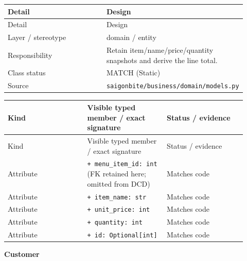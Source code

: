 \begin{longtable}{>{\raggedright\arraybackslash}p{0.4600\linewidth}>{\raggedright\arraybackslash}p{0.4600\linewidth}}
Detail & Design \\
\hline\endfirsthead
Detail & Design \\
\hline\endhead
Layer / stereotype & domain / \guillemotleft{}entity\guillemotright{} \\
Responsibility & Retain item/name/price/quantity snapshots and derive the line total. \\
Class status & MATCH (Static) \\
Source & \texttt{saigonbite/\allowbreak{}business/\allowbreak{}domain/\allowbreak{}models.\allowbreak{}py} \\
\end{longtable}
\begin{longtable}{>{\raggedright\arraybackslash}p{0.3067\linewidth}>{\raggedright\arraybackslash}p{0.3067\linewidth}>{\raggedright\arraybackslash}p{0.3067\linewidth}}
Kind & Visible typed member / exact signature & Status / evidence \\
\hline\endfirsthead
Kind & Visible typed member / exact signature & Status / evidence \\
\hline\endhead
Attribute & \texttt{+ menu\_\allowbreak{}item\_\allowbreak{}id: int} (FK retained here; omitted from DCD) & Matches code \\
Attribute & \texttt{+ item\_\allowbreak{}name: str} & Matches code \\
Attribute & \texttt{+ unit\_\allowbreak{}price: int} & Matches code \\
Attribute & \texttt{+ quantity: int} & Matches code \\
Attribute & \texttt{+ id: Optional[int]} & Matches code \\
\end{longtable}
\textbf{Customer}

